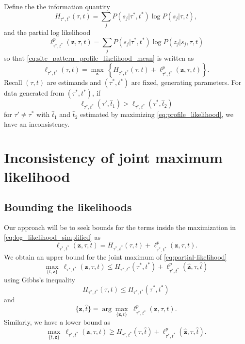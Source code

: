 \documentclass[a4paper]{article}
\newcommand{\sitePattern}{s}
\newcommand{\ancestralStateCategory}{z}
\newcommand{\fullAncestralStateCategories}{\mathbf{z}}
\begin{document}
Define the the information quantity
$$
H_{\tau^*,t^*}(\tau,t) = \sum_{j} P(\sitePattern_j | \tau^*, t^*) \log P(\sitePattern_j | \tau, t),
$$
and the partial log likelihood
$$
\ell^p_{\tau^*,t^*}(\fullAncestralStateCategories,\tau,t) = \sum_{j} P(\sitePattern_j | \tau^*, t^*) \log P(\ancestralStateCategory_j | \sitePattern_j, \tau, t)
$$
so that \eqref{eq:site_pattern_profile_likelihood_mean} is written as
\begin{equation}
    \label{eq:log_likelihood_simplified}
\ell_{\tau^*,t^*}(\tau,t) = \max_{\fullAncestralStateCategories} \ \left\{H_{\tau^*,t^*}(\tau,t) + \ell^p_{\tau^*,t^*}(\fullAncestralStateCategories,\tau,t)\right\}.
\end{equation}
Recall $(\tau, t)$ are estimands and $(\tau^*, t^*)$ are fixed, generating parameters.
For data generated from $(\tau^*, t^*)$, if
\begin{equation}
\label{eq:inconsistency_inequality}
\ell_{\tau^*,t^*}(\tau',\hat{t}_1) > \ell_{\tau^*,t^*}(\tau^*,\hat{t}_2)
\end{equation}
for $\tau'\neq\tau^*$ with $\hat{t}_1$ and $\hat{t}_2$ estimated by maximizing \eqref{eq:profile_likelihood}, we have an inconsistency.

\section{Inconsistency of joint maximum likelihood}

\subsection{Bounding the likelihoods}

Our approach will be to seek bounds for the terms inside the maximization in \eqref{eq:log_likelihood_simplified} as
\begin{equation}
\label{eq:partial-likelihood}
\ell_{\tau^*,t^*}(\fullAncestralStateCategories,\tau,t) = H_{\tau^*,t^*}(\tau,t) + \ell^p_{\tau^*,t^*}(\fullAncestralStateCategories,\tau,t).
\end{equation}
We obtain an upper bound for the joint maximum of \eqref{eq:partial-likelihood}
$$
\max_{\{t,\fullAncestralStateCategories\}} \ \ell_{\tau^*,t^*}(\fullAncestralStateCategories,\tau,t) \le
    H_{\tau^*,t^*}(\tau^*,t^*)
    + \ell^p_{\tau^*,t^*}(\hat{\fullAncestralStateCategories},\tau,\hat{t})
$$
using Gibbs's inequality
$$
H_{\tau^*,t^*}(\tau,t) \le H_{\tau^*,t^*}(\tau^*,t^*)
$$
and
$$
\{\hat{\fullAncestralStateCategories},\hat{t}\} = \arg\max_{\{\fullAncestralStateCategories,t\}} \ \ell^p_{\tau^*,t^*}(\fullAncestralStateCategories,\tau,t).
$$
Similarly, we have a lower bound as
$$
\max_{\{t,\fullAncestralStateCategories\}} \ \ell_{\tau^*,t^*}(\fullAncestralStateCategories,\tau,t) \ge
    H_{\tau^*,t^*}(\tau,\hat{t})
    + \ell^p_{\tau^*,t^*}(\hat{\fullAncestralStateCategories},\tau,\hat{t}).
$$
\end{document}
